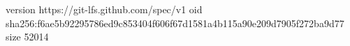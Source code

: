 version https://git-lfs.github.com/spec/v1
oid sha256:f6ae5b92295786ed9c853404f606f67d1581a4b115a90e209d7905f272ba9d77
size 52014
